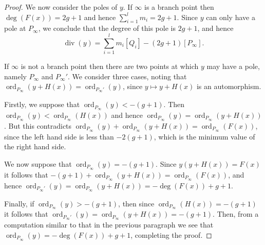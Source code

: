 \documentclass[draft, 11pt]{article} %
\theoremstyle{plain}
\theoremstyle{remark}
\DeclareMathOperator{\ord}{ord}
\DeclareMathOperator{\di}{div}
\begin{document}
\begin{proof}
We now consider the poles of $y$.
If $\infty$ is a branch point then $\deg(F(x)) = 2g+1$ and hence $\sum_{i=1}^l m_i = 2g+1$.
Since $y$ can only have a pole at $P_\infty$, we conclude that the degree of this pole is $2g+1$, and hence
\[
\di(y) = \sum_{i=1}^l m_i [Q_i] - (2g+1)[P_\infty].
\]

If $\infty$ is not a branch point then there are two points at which $y$ may have a pole, namely $P_\infty$ and $P_\infty'$.
We consider three cases, noting that $\ord_{P_\infty}(y + H(x)) = \ord_{P_\infty'}(y)$, since $y \mapsto y+H(x)$ is an automorphism.


Firstly, we suppose that $\ord_{P_\infty}(y) < -(g+1)$.
Then $\ord_{P_\infty}(y) < \ord_{P_\infty}(H(x))$ and hence $ \ord_{P_\infty}(y) = \ord_{P_\infty}(y+H(x))$.
But this contradicts $\ord_{P_\infty}(y) + \ord_{P_\infty}(y+H(x)) = \ord_{P_\infty}(F(x))$, since the left hand side is less than $-2(g+1)$, which is the minimum value of the right hand side.

We now suppose that $\ord_{P_\infty} (y) = -(g+1)$. Since $y(y+H(x)) = F(x)$ it follows that $-(g+1) + \ord_{P_\infty}(y+H(x)) = \ord_{P_\infty}(F(x))$, and hence $\ord_{P_\infty'}(y) = \ord_{P_\infty}(y+H(x)) = -\deg(F(x)) + g + 1$.

Finally, if $\ord_{P_\infty}(y) > -(g+1)$, then since $\ord_{P_\infty}(H(x)) = -(g+1)$ it follows that $\ord_{P_\infty'}(y) = \ord_{P_\infty} (y+H(x)) = -(g+1)$.
Then, from a computation similar to that in the previous paragraph we see that $\ord_{P_\infty}(y) = -\deg(F(x)) + g +1$, completing the proof.
\end{proof}
\end{document}
